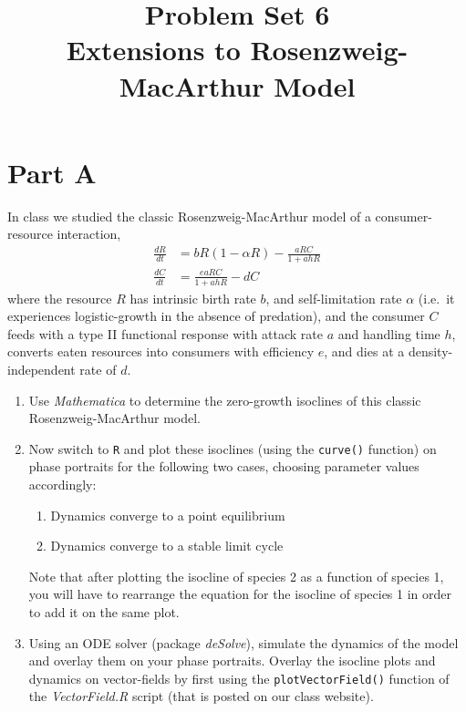 \documentclass[11pt,letterpaper]{article}
\title{\textbf{Problem Set 6}\\Extensions to Rosenzweig-MacArthur Model\vspace{-3em}}
\date{}
\author{}
\begin{document}
	\maketitle
	
	\section{Part A}
	
	In class we studied the classic Rosenzweig-MacArthur model of a consumer-resource interaction,
	\begin{align}
		\frac{dR}{dt} & = b R (1- \alpha R) - \frac{ a R C}{1 + a h R} \\
		\frac{dC}{dt} & = \frac{e a R C}{1 + a h R} - d C
	\end{align}
	where the resource $R$ has intrinsic birth rate $b$, and self-limitation rate $\alpha$ (i.e.~it experiences logistic-growth in the absence of predation), and the consumer $C$ feeds with a type II functional response with attack rate $a$ and handling time $h$, converts eaten resources into consumers with efficiency $e$, and dies at a density-independent rate of $d$.
	
	\begin{enumerate}
	\item Use \textit{Mathematica} to determine the zero-growth isoclines of this classic Rosenzweig-MacArthur model.
	
	\item Now switch to \texttt{R} and plot these isoclines (using the \texttt{curve()} function) on phase portraits for the following two cases, choosing parameter values accordingly:
		\begin{enumerate}
		\item Dynamics converge to a point equilibrium
		\item Dynamics converge to a stable limit cycle
		\end{enumerate}
	Note that after plotting the isocline of species 2 as a function of species 1, you will have to rearrange the equation for the isocline of species 1 in order to add it on the same plot.
	
	\item Using an ODE solver (package \textit{deSolve}), simulate the dynamics of the model and overlay them on your phase portraits.  
	Overlay the isocline plots and dynamics on vector-fields by first using the \texttt{plotVectorField()} function of the \textit{VectorField.R} script (that is posted on our class website).
	
	\end{enumerate}
	
\end{document}
